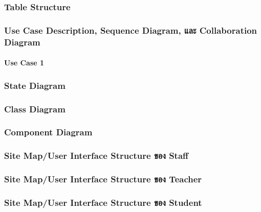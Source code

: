 \subsubsection{Table Structure}

\subsubsection{Use Case Description, Sequence Diagram, และ Collaboration Diagram}

\paragraph{Use Case 1}

\subsubsection{State Diagram}

\subsubsection{Class Diagram}

\subsubsection{Component Diagram}

\subsubsection{Site Map/User Interface Structure ของ Staff}

\subsubsection{Site Map/User Interface Structure ของ Teacher}

\subsubsection{Site Map/User Interface Structure ของ Student}
